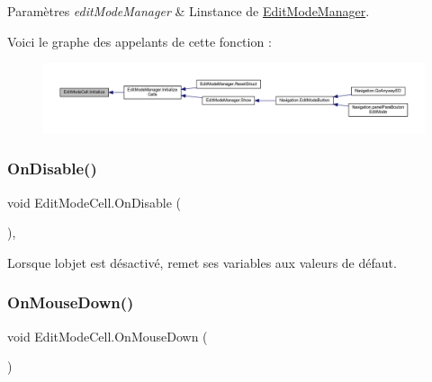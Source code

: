 \begin{DoxyParams}{Paramètres}
{\em edit\+Mode\+Manager} & L\textquotesingle{}instance de \mbox{\hyperlink{class_edit_mode_manager}{Edit\+Mode\+Manager}}.\\
\hline
\end{DoxyParams}
Voici le graphe des appelants de cette fonction \+:\nopagebreak
\begin{figure}[H]
\begin{center}
\leavevmode
\includegraphics[width=350pt]{class_edit_mode_cell_a85064e1ba44195ce0a8fa8c66f8e5ffa_icgraph}
\end{center}
\end{figure}
\mbox{\label{class_edit_mode_cell_a2438766a46d0b93aba3e92340f51bd10}} 
\subsubsection{\texorpdfstring{On\+Disable()}{OnDisable()}}
{\footnotesize\ttfamily void Edit\+Mode\+Cell.\+On\+Disable (\begin{DoxyParamCaption}{ }\end{DoxyParamCaption})\hspace{0.3cm}{\ttfamily [inline]}, {\ttfamily [private]}}



Lorsque l\textquotesingle{}objet est désactivé, remet ses variables aux valeurs de défaut. 

\mbox{\label{class_edit_mode_cell_a692f6272d4ef7a51092aef52a599233d}} 
\subsubsection{\texorpdfstring{On\+Mouse\+Down()}{OnMouseDown()}}
{\footnotesize\ttfamily void Edit\+Mode\+Cell.\+On\+Mouse\+Down (\begin{DoxyParamCaption}{ }\end{DoxyParamCaption})\hspace{0.3cm}{\ttfamily [inline]}}



